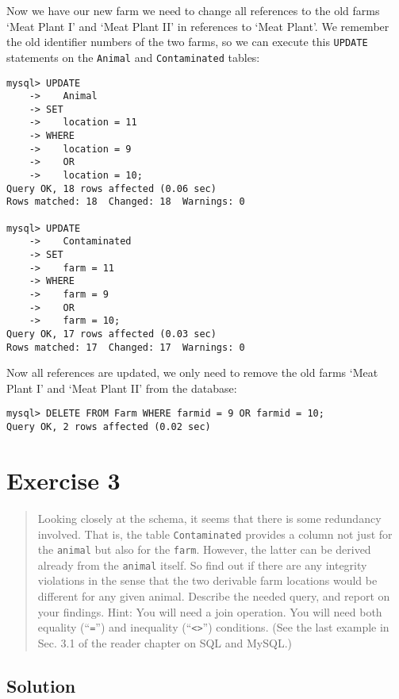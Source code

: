 \documentclass[11pt]{article}
\begin{document}
Now we have our new farm we need to change all references to the old farms `Meat Plant I' and `Meat Plant II' in references to `Meat Plant'. We remember the old identifier numbers of the two farms, so we can execute this \verb|UPDATE| statements on the \verb|Animal| and \verb|Contaminated| tables:

\newpage

\begin{verbatim}
mysql> UPDATE
    ->    Animal
    -> SET
    ->    location = 11
    -> WHERE
    ->    location = 9
    ->    OR
    ->    location = 10;
Query OK, 18 rows affected (0.06 sec)
Rows matched: 18  Changed: 18  Warnings: 0

mysql> UPDATE
    ->    Contaminated
    -> SET
    ->    farm = 11
    -> WHERE
    ->    farm = 9
    ->    OR
    ->    farm = 10;
Query OK, 17 rows affected (0.03 sec)
Rows matched: 17  Changed: 17  Warnings: 0
\end{verbatim}

Now all references are updated, we only need to remove the old farms `Meat Plant I' and `Meat Plant II' from the database:

\begin{verbatim}
mysql> DELETE FROM Farm WHERE farmid = 9 OR farmid = 10;
Query OK, 2 rows affected (0.02 sec)
\end{verbatim}


\newpage

\section{Exercise 3}

\begin{quote}
Looking closely at the schema, it seems that there is some redundancy involved. That is, the table \verb|Contaminated| provides a column not just for the \verb|animal| but also for the \verb|farm|. However, the latter can be derived already from the \verb|animal| itself. So find out if there are any integrity violations in the sense that the two derivable farm locations would be different for any given animal. Describe the needed query, and report on your findings. Hint: You will need a join operation. You will need both equality (``\verb|=|'') and inequality (``\verb|<>|'') conditions. (See the last example in Sec. 3.1 of the reader chapter on SQL and MySQL.)
\end{quote}

\subsection*{Solution}
\end{document}
